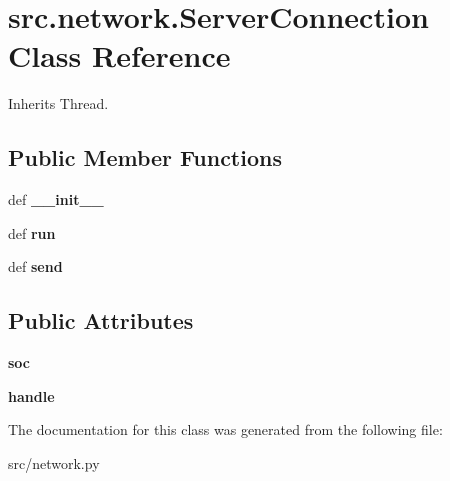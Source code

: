\hypertarget{classsrc_1_1network_1_1_server_connection}{\section{src.\-network.\-Server\-Connection \-Class \-Reference}
\label{classsrc_1_1network_1_1_server_connection}
}


\-Inherits \-Thread.

\subsection*{\-Public \-Member \-Functions}
\begin{DoxyCompactItemize}
\item 
\hypertarget{classsrc_1_1network_1_1_server_connection_a4c5668c5a8a9a4a465c62b028a643221}{def {\bfseries \-\_\-\-\_\-init\-\_\-\-\_\-}}\label{classsrc_1_1network_1_1_server_connection_a4c5668c5a8a9a4a465c62b028a643221}

\item 
\hypertarget{classsrc_1_1network_1_1_server_connection_a3145a5740f6734de3a319e3b445ca7ca}{def {\bfseries run}}\label{classsrc_1_1network_1_1_server_connection_a3145a5740f6734de3a319e3b445ca7ca}

\item 
\hypertarget{classsrc_1_1network_1_1_server_connection_a68a0541f7a7e13f4726466e4cd297d5b}{def {\bfseries send}}\label{classsrc_1_1network_1_1_server_connection_a68a0541f7a7e13f4726466e4cd297d5b}

\end{DoxyCompactItemize}
\subsection*{\-Public \-Attributes}
\begin{DoxyCompactItemize}
\item 
\hypertarget{classsrc_1_1network_1_1_server_connection_a5bbbb7744db22d71f8b7bbf26460105c}{{\bfseries soc}}\label{classsrc_1_1network_1_1_server_connection_a5bbbb7744db22d71f8b7bbf26460105c}

\item 
\hypertarget{classsrc_1_1network_1_1_server_connection_a57f0bb2d7eeb65b75c952684f4450eea}{{\bfseries handle}}\label{classsrc_1_1network_1_1_server_connection_a57f0bb2d7eeb65b75c952684f4450eea}

\end{DoxyCompactItemize}


\-The documentation for this class was generated from the following file\-:\begin{DoxyCompactItemize}
\item 
src/network.\-py\end{DoxyCompactItemize}
